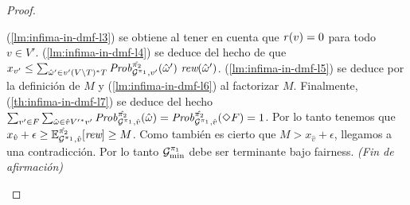 \begin{proof}
\begin{proofofclaim}
    (\ref{lm:infima-in-dmf-l3}) se obtiene al tener en cuenta que $\mathit{r}(v) = 0$ para todo $v \in V'$.
    (\ref{lm:infima-in-dmf-l4}) se deduce del hecho de que 
    $x_{v'} \leq \sum_{\hat{\omega}' \in v' (V \setminus T)^*T}  \MDPProb{\hat{\strat{2}}}_{\StochG^{\strat{1}},v'}(\hat{\omega}')\ \Rewards(\hat{\omega}')$.
    (\ref{lm:infima-in-dmf-l5}) se deduce por la definición de $M$ y
    (\ref{lm:infima-in-dmf-l6}) al factorizar $M$.
    Finalmente, (\ref{th:infima-in-dmf-l7}) se deduce del hecho 
    $\sum_{v' \in F} \sum_{\hat{\omega} \in \hat{v}{V'}^*v'} \mathit{Prob}^{\hat{\pi_{2}}}_{\mathcal{G}^{\pi_{1}},\hat{v}}(\hat{\omega}) =
    \mathit{Prob}^{\hat{\pi_{2}}}_{\mathcal{G}^{\pi_{1}},\hat{v}} (\Diamond F) = 1$.
    Por lo tanto tenemos que
    $x_{\hat{v}} + \epsilon \geq \mathbb{E}^{\hat{\pi_{2}}}_{\mathcal{G}^{\pi_{1}},\hat{v}}[\textit{rew}] \geq M$.
    Como también es cierto que $M >  x_{\hat{v}} + \epsilon$, llegamos a una contradicción.
    Por lo tanto $\mathcal{G}^{\pi_{1}}_{\min}$ debe ser terminante bajo fairness.
    \hfill\emph{(Fin de afirmación)}\qedhere
  \end{proofofclaim}



\end{proof}
